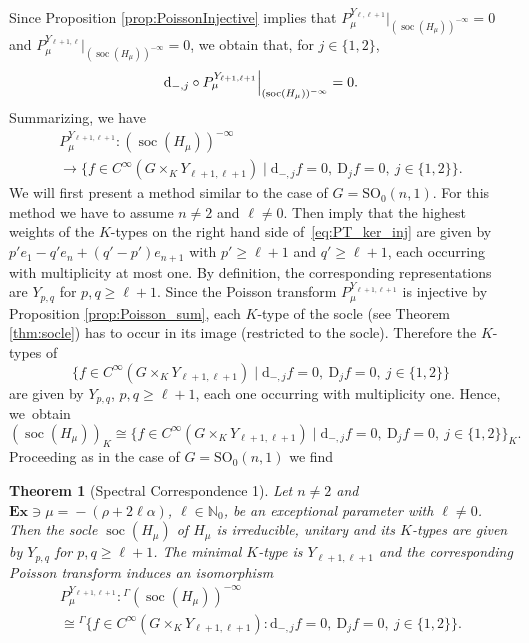 \documentclass[JEP,XML,SOM,NoFloatCountersInSection,Unicode,published]{cedram}
\newcommand{\Ga}{{}^\Gamma\!}
\newtheorem{theorem}{Theorem}[section]
\theoremstyle{definition}
\newcommand\restr[2]{{
\left.\kern-\nulldelimiterspace
#1
\vphantom{\big|}
\right|_{#2}
}}
\newcommand{\on}[1]{\ensuremath{\operatorname{#1}}}
\newcommand{\rhoa}{\ensuremath{\rho}}
\newcommand{\N}{\ensuremath{\mathbb{N}}}
\newcommand{\pst}[1]{\ensuremath{H_{#1}}}
\newcommand{\GSO}[1]{\ensuremath{\mathrm{SO}_0(#1,1)}}
\begin{document}
Since Proposition \ref{prop:PoissonInjective} implies that $P_\mu^{Y_{\ell,\ell+1}}|_{(\on{soc}(\pst{\mu}))^{-\infty}}\!=\!0$ and \hbox{$P_\mu^{Y_{\ell+1,\ell}}|_{(\on{soc}(\pst{\mu}))^{-\infty}}\!=\!0$}, we obtain that, for $j\in\{1,2\}$,\vspace*{-3pt}
\[
\mathrm{d}_{-,j}\circ\restr{P_\mu^{Y_{\ell+1,\ell+1}}}{(\on{soc}(\pst{\mu}))^{-\infty}}=0.
\]
Summarizing, we have\vspace*{-3pt}
\begin{multline}\label{eq:PT_ker_inj}
P_\mu^{Y_{\ell+1,\ell+1}}:(\on{soc}(\pst{\mu}))^{-\infty}\\
\to\{f\in C^\infty(G\times_KY_{\ell+1,\ell+1})\mid\mathrm{d}_{-,j}f=0,\ \mathrm{D}_jf=0,\ j\in\{1,2\}\}.
\end{multline}
We will first present a method similar to the case of $G=\GSO{n}$. For this method we have to assume $n\neq 2$ and $\ell\neq 0$. Then \cite[Eq.\,(2.7.3), (2.7.4), Lem.\,6.2.1, Prop.\,6.4.6]{M89} imply that the highest weights of the $K$-types on the right hand side of~\eqref{eq:PT_ker_inj} are given by $p'e_1-q'e_n+(q'-p')e_{n+1}$ with $p'\geq\ell+1$ and \hbox{$q'\geq\ell+1$}, each occurring with multiplicity at most one. By definition, the corresponding representations are $Y_{p,q}$ for $p,q\geq\ell+1$. Since the Poisson transform $P_\mu^{Y_{\ell+1,\ell+1}}$ is injective by Proposition \ref{prop:Poisson_sum}, each $K$-type of the socle (see Theorem \ref{thm:socle}) has to occur in its image (restricted to the socle). Therefore the $K$-types of
\[
\{f\in C^\infty(G\times_KY_{\ell+1,\ell+1})\mid\mathrm{d}_{-,j}f=0,\ \mathrm{D}_jf=0,\ j\in\{1,2\}\}
\]
are given by $Y_{p,q}$, $p,q\geq\ell+1$, each one occurring with multiplicity one. Hence, we~obtain\vspace*{-3pt}
\[
(\on{soc}(\pst{\mu}))_K\cong\{f\in C^\infty(G\times_KY_{\ell+1,\ell+1})\mid\mathrm{d}_{-,j}f=0,\ \mathrm{D}_jf=0,\ j\in\{1,2\}\}_K.
\]
Proceeding as in the case of $G=\GSO{n}$ we find
\begin{theorem}[Spectral Correspondence 1]\label{thm:spectral_corres_SUn1}
Let $n\!\neq\! 2$ and $\mathbf{Ex}\!\ni\!\mu\!=\!-(\rhoa\!+\!2\ell\alpha)$, $\ell\in\N_0$, be an exceptional parameter with $\ell\neq0$. Then the socle $\on{soc}(\pst{\mu})$ of $\pst{\mu}$ is irreducible, unitary and its $K$-types are given by $Y_{p,q}$ for $p,q\geq\ell+1$. The minimal $K$-type is $Y_{\ell+1,\ell+1}$ and the corresponding Poisson transform induces an isomorphism
\begin{multline*}
P_\mu^{Y_{\ell+1,\ell+1}}\colon\Ga(\on{soc}(\pst{\mu}))^{-\infty}\\\cong\Ga\{f\in C^\infty(G\times_KY_{\ell+1,\ell+1})\colon\mathrm{d}_{-,j}f=0,\ \mathrm{D}_jf=0,\ j\in\{1,2\}\}.
\end{multline*}
\end{theorem}
\end{document}
